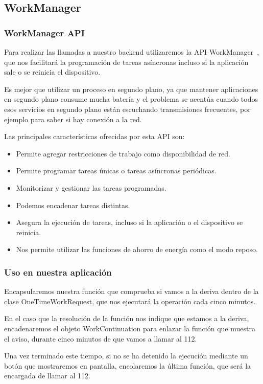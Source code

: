 \label{jobscheduler}

\subsection{WorkManager}
\subsubsection{WorkManager API}
Para realizar las llamadas a nuestro backend utilizaremos la API
WorkManager~\cite{ANDROIDWORKMANAGER}, que nos facilitará la programación de tareas asíncronas
incluso si la aplicación sale o se reinicia el
dispositivo.

Es mejor que utilizar un proceso en segundo plano, ya que
 mantener aplicaciones en segundo plano consume mucha batería
 y el problema se acentúa cuando todos esos servicios en segundo
 plano están escuchando transmisiones frecuentes, por ejemplo
 para saber si hay conexión a la red.

Las principales características ofrecidas por esta API son:

\begin{itemize}
\item Permite agregar restricciones de trabajo como disponibilidad de red.
\item Permite programar tareas únicas o tareas asíncronas periódicas.
\item Monitorizar y gestionar las tareas programadas.
\item Podemos encadenar tareas distintas.
\item Asegura la ejecución de tareas, incluso si la aplicación o 
el dispositivo se reinicia.
\item Nos permite utilizar las funciones de ahorro de energía
 como el modo reposo.
\end{itemize}

\subsubsection{Uso en nuestra aplicación}

Encapsularemos nuestra función que comprueba si vamos a la deriva
 dentro de la clase OneTimeWorkRequest, que nos ejecutará la 
operación cada cinco minutos.

En el caso que la resolución de la función nos indique que estamos
 a la deriva, encadenaremos el objeto WorkContinuation para enlazar
 la función que muestra el aviso, durante cinco minutos de que vamos a llamar al 112.

Una vez terminado este tiempo, si no se ha detenido la ejecución mediante un botón que mostraremos en pantalla, encolaremos la última función, que será la encargada de llamar al 112.


